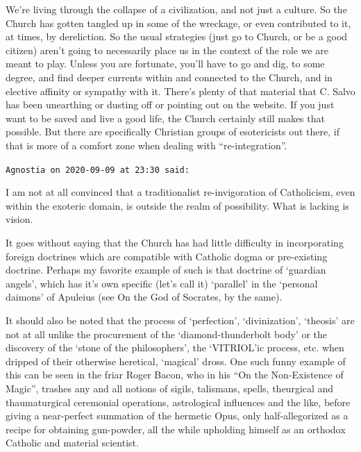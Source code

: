 \begin{footnotesize}
\begin{sffamily}
We're living through the collapse of a civilization, and not just a culture. So the Church has gotten
tangled up in some of the wreckage, or even contributed to it, at times, by dereliction. So the usual strategies (just
go to Church, or be a good citizen) aren't going to necessarily place us in the context of the role we are
meant to play. Unless you are fortunate, you'll have to go and dig, to some degree, and find deeper
currents within and connected to the Church, and in elective affinity or sympathy with it. There's plenty
of that material that C. Salvo has been unearthing or dusting off or pointing out on the website. If you just want to
be saved and live a good life, the Church certainly still makes that possible. But there are specifically Christian
groups of esotericists out there, if that is more of a comfort zone when dealing with “re-integration”.


\hfill

\texttt{Agnostia on 2020-09-09 at 23:30 said: }

I am not at all convinced that a traditionalist re-invigoration of Catholicism, even within the exoteric domain, is
outside the realm of possibility. What is lacking is vision.

It goes without saying that the Church has had little difficulty in incorporating foreign doctrines which are compatible
with Catholic dogma or pre-existing doctrine. Perhaps my favorite example of such is that doctrine of
`guardian angels', which has it's own specific (let's call it)
`parallel' in the `personal daimons' of Apuleius (see On the God of
Socrates, by the same).

It should also be noted that the process of `perfection’, ‘divinization’, ‘theosis' are not at all unlike the procurement of the `diamond-thunderbolt body’ or the discovery of the `stone of the philosophers', the `VITRIOL'ic
process, etc. when dripped of their otherwise heretical, `magical' dross. One such funny
example of this can be seen in the friar Roger Bacon, who in his “On the Non-Existence of Magic”, trashes any and all
notions of sigils, talismans, spells, theurgical and thaumaturgical ceremonial operations, astrological influences and
the like, before giving a near-perfect summation of the hermetic Opus, only half-allegorized as a recipe for obtaining
gun-powder, all the while upholding himself as an orthodox Catholic and material scientist.


\end{sffamily}
\end{footnotesize}
